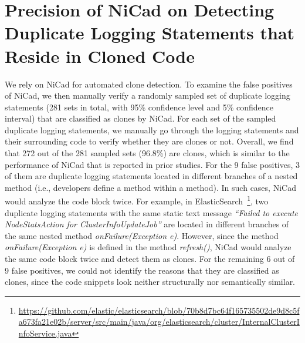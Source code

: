 \documentclass[10pt,journal,compsoc]{IEEEtran}
\begin{document}
\section{Precision of NiCad on Detecting Duplicate Logging Statements that Reside in Cloned Code}
\label{sec:appendix2}
We rely on NiCad for automated clone detection. To examine the false positives of NiCad, we then manually verify a randomly sampled set of duplicate logging statements (281 sets in total, with 95\% confidence level and 5\% confidence interval) that are classified as clones by NiCad. For each set of the sampled duplicate logging statements, we manually go through the logging statements and their surrounding code to verify whether they are clones or not. Overall, we find that 272 out of the 281 sampled sets (96.8\%) are clones, which is similar to the performance of NiCad that is reported in prior studies. For the 9 false positives, 3 of them are duplicate logging statements located in different branches of a nested method (i.e., developers define a method within a method). In such cases, NiCad would analyze the code block twice. For example, in ElasticSearch~\footnote{\url{https://github.com/elastic/elasticsearch/blob/70b8d7bc64f165735502de9d8c5fa673fa21e02b/server/src/main/java/org/elasticsearch/cluster/InternalClusterInfoService.java}}, two duplicate logging statements with the same static text message {\em ``Failed to execute NodeStatsAction for ClusterInfoUpdateJob''} are located in different branches of the same nested method {\em onFailure(Exception e)}. However, since the method {\em onFailure(Exception e)} is defined in the method {\em refresh()}, NiCad would analyze the same code block twice and detect them as clones. For the remaining 6 out of 9 false positives, we could not identify the reasons that they are classified as clones, since the code snippets look neither structurally nor semantically similar.
\end{document}
